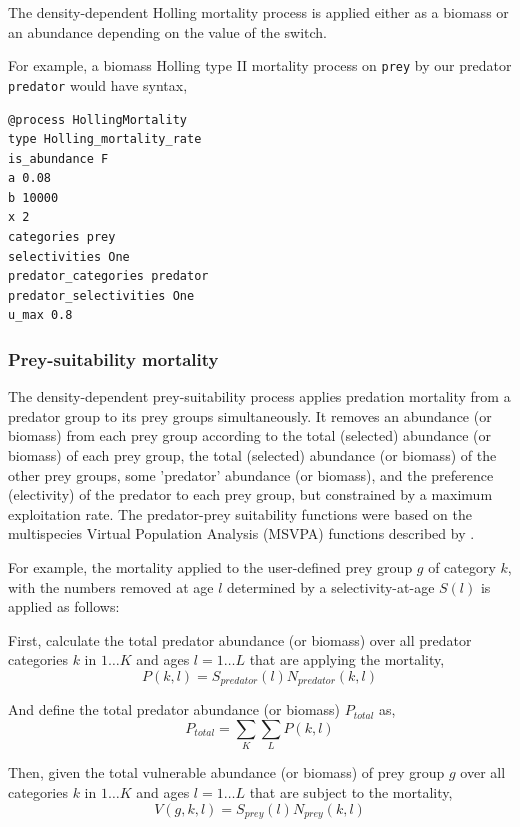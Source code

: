 The density-dependent Holling mortality process is applied either as a biomass or an abundance depending on the value of the  switch.

For example, a biomass Holling type II mortality process on \texttt{prey} by our predator \texttt{predator} would have syntax,

{\small{\begin{verbatim}
@process HollingMortality
type Holling_mortality_rate
is_abundance F
a 0.08
b 10000
x 2
categories prey
selectivities One
predator_categories predator
predator_selectivities One
u_max 0.8
\end{verbatim}}}

\subsubsection*{Prey-suitability mortality}

The density-dependent prey-suitability process applies predation mortality from a predator group to its prey groups simultaneously. It removes an abundance (or biomass) from each prey group according to the total (selected) abundance (or biomass) of each prey group, the total (selected) abundance (or biomass) of the other prey groups, some 'predator' abundance (or biomass), and the preference (electivity) of the predator to each prey group, but constrained by a maximum exploitation rate. The predator-prey suitability functions were based on the multispecies Virtual Population Analysis (MSVPA) functions described by \citep{JuradoMolina2005}.

For example, the mortality applied to the user-defined prey group $g$ of category $k$, with the numbers removed at age $l$ determined by a selectivity-at-age $S(l)$ is applied as follows:

First, calculate the total predator abundance (or biomass) over all predator categories $k$ in $1 \ldots K$ and ages $l = 1 \ldots L$ that are applying the mortality,
\begin{equation}
  P(k,l) = S_{predator}(l) N_{predator}(k,l)
\end{equation}

And define the total predator abundance (or biomass) $P_{total}$ as,
\begin{equation}
  P_{total}  = \sum\limits_K {\sum\limits_L {P(k,l)}} 
\end{equation}

Then, given the total vulnerable abundance (or biomass) of prey group $g$ over all categories $k$ in $1 \ldots K$ and ages $l = 1 \ldots L$ that are subject to the mortality,
\begin{equation}
  V(g,k,l) = S_{prey}(l) N_{prey}(k,l)
\end{equation}

